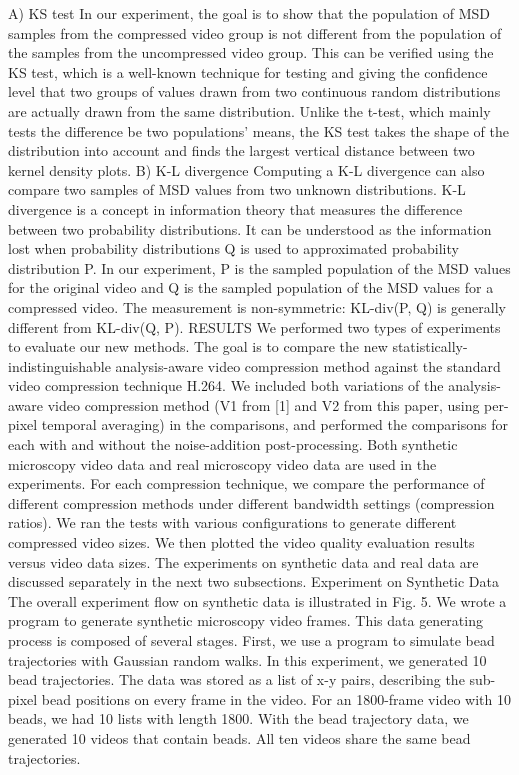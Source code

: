A) KS test
In our experiment, the goal is to show that the population of MSD samples from the compressed video group is not different from the population of the samples from the uncompressed video group. This can be verified using the KS test, which is a well-known technique for testing and giving the confidence level that two groups of values drawn from two continuous random distributions are actually drawn from the same distribution. Unlike the t-test, which mainly tests the difference be two populations’ means, the KS test takes the shape of the distribution into account and finds the largest vertical distance between two kernel density plots.
B) K-L divergence
Computing a K-L divergence can also compare two samples of MSD values from two unknown distributions. K-L divergence is a concept in information theory that measures the difference between two probability distributions. It can be understood as the information lost when probability distributions Q is used to approximated probability distribution P. In our experiment, P is the sampled population of the MSD values for the original video and Q is the sampled population of the MSD values for a compressed video. The measurement is non-symmetric: KL-div(P, Q) is generally different from KL-div(Q, P).
RESULTS
We performed two types of experiments to evaluate our new methods. The goal is to compare the new statistically-indistinguishable analysis-aware video compression method against the standard video compression technique H.264. We included both variations of the analysis-aware video compression method (V1 from [1] and V2 from this paper, using per-pixel temporal averaging) in the comparisons, and performed the comparisons for each with and without the noise-addition post-processing. Both synthetic microscopy video data and real microscopy video data are used in the experiments.
For each compression technique, we compare the performance of different compression methods under different bandwidth settings (compression ratios). We ran the tests with various configurations to generate different compressed video sizes. We then plotted the video quality evaluation results versus video data sizes. The experiments on synthetic data and real data are discussed separately in the next two subsections.
Experiment on Synthetic Data
The overall experiment flow on synthetic data is illustrated in Fig. 5. We wrote a program to generate synthetic microscopy video frames. This data generating process is composed of several stages. First, we use a program to simulate bead trajectories with Gaussian random walks. In this experiment, we generated 10 bead trajectories. The data was stored as a list of x-y pairs, describing the sub-pixel bead positions on every frame in the video. For an 1800-frame video with 10 beads, we had 10 lists with length 1800. With the bead trajectory data, we generated 10 videos that contain beads. All ten videos share the same bead trajectories.
